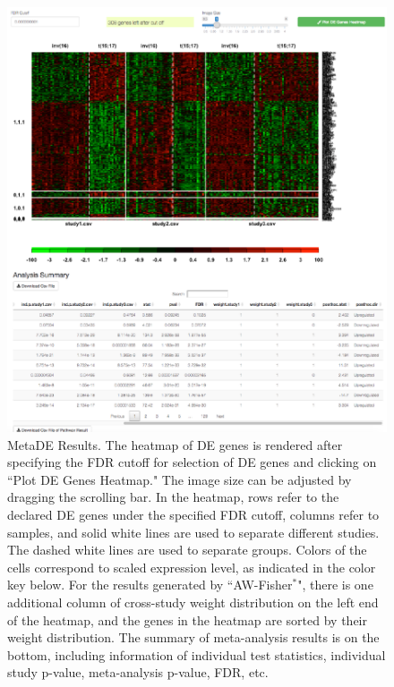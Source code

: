 \begin{figure}[H]
\begin{center}
\includegraphics[scale=1]{./figure/metaDE/metaDEresult.pdf}
\caption{MetaDE Results.
The heatmap of DE genes is rendered after specifying the FDR cutoff for selection of DE genes and clicking on ``Plot DE Genes Heatmap." 
The image size can be adjusted by dragging the scrolling bar. 
In the heatmap, rows refer to the declared DE genes under the specified FDR cutoff, 
columns refer to samples, and solid white lines are used to separate different studies. 
The dashed white lines are used to separate groups. 
Colors of the cells correspond to scaled expression level, 
as indicated in the color key below. 
For the results generated by ``AW-Fisher$^{\ast}$", there is one additional column of cross-study weight distribution on the left end of the heatmap,
and the genes in the heatmap are sorted by their weight distribution.
The summary of meta-analysis results is on the bottom, 
including information of individual test statistics, individual study p-value, meta-analysis p-value, FDR, etc. 
}
\label{fig:MetaDEresult1}
\end{center}
\end{figure}

